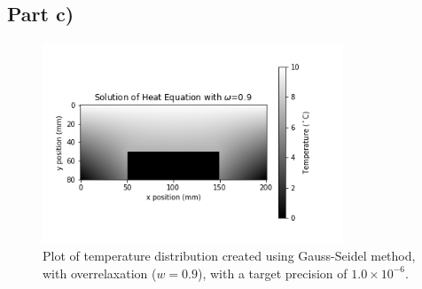 \documentclass{article}
\begin{document}
\subsection{Part c)}

\begin{figure}[H]
	\centering
	\includegraphics[width=0.8\textwidth]{../images/q1_c.png}
	\caption{Plot of temperature distribution created using Gauss-Seidel method, with overrelaxation ($w=0.9$), with a target precision of $1.0\times 10^{-6}$.}
	\label{fig:1b_w=0.9}
\end{figure}
\end{document}
